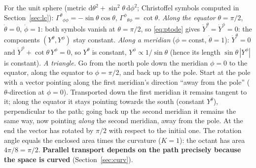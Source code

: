 \documentclass[11pt,a4paper]{article}
\numberwithin{equation}{section}
\theoremstyle{definition}
\theoremstyle{plain}
\newcommand{\dd}{\mathrm{d}}
\begin{document}
\begin{example}
For the unit sphere (metric $\dd\theta^2+\sin^2\theta\,\dd\phi^2$; Christoffel symbols computed in Section~\ref{sec:lc}): $\Gamma^\theta{}_{\phi\phi}=-\sin\theta\cos\theta$, $\Gamma^\phi{}_{\theta\phi}=\cot\theta$. 
\emph{Along the equator} $\theta=\pi/2$, $\dot\theta=0$, $\dot\phi=1$: both symbols vanish at $\theta=\pi/2$, so \eqref{eq:ptode} gives $\dot Y^\theta=\dot Y^\phi=0$: the components $(Y^\theta,Y^\phi)$ stay constant.
\emph{Along a meridian} ($\phi=\mathrm{const}$, $\dot\theta=1$): $\dot Y^\theta=0$ and $\dot Y^\phi+\cot\theta\,Y^\phi=0$, so $Y^\theta$ is constant, $Y^\phi\propto 1/\sin\theta$ (hence its length $\sin\theta\,|Y^\phi|$ is constant).
\emph{A triangle.} Go from the north pole down the meridian $\phi=0$ to the equator, along the equator to $\phi=\pi/2$, and back up to the pole. Start at the pole with a vector pointing along the first meridian's direction ``away from the pole'' ($\theta$-direction at $\phi=0$). Transported down the first meridian it remains tangent to it; along the equator it stays pointing towards the south (constant $Y^\theta$), perpendicular to the path; going back up the second meridian it remains the same way, now pointing \emph{along} the second meridian, away from the pole. At the end the vector has rotated by $\pi/2$ with respect to the initial one. The rotation angle equals the enclosed area times the curvature ($K=1$): the octant has area $4\pi/8=\pi/2$. \textbf{Parallel transport depends on the path precisely because the space is curved} (Section~\ref{sec:curv}).
\end{example}
\end{document}
